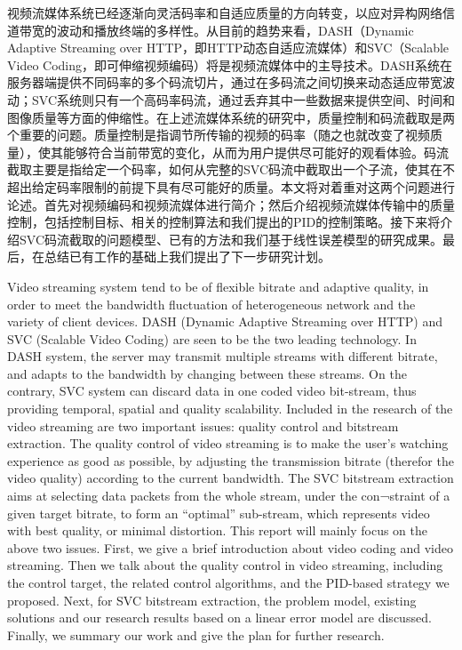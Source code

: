 \begin{cabstract}
视频流媒体系统已经逐渐向灵活码率和自适应质量的方向转变，以应对异构网络信道带宽的波动和播放终端的多样性。从目前的趋势来看，DASH（Dynamic Adaptive Streaming over HTTP，即HTTP动态自适应流媒体）和SVC（Scalable Video Coding，即可伸缩视频编码）将是视频流媒体中的主导技术。DASH系统在服务器端提供不同码率的多个码流切片，通过在多码流之间切换来动态适应带宽波动；SVC系统则只有一个高码率码流，通过丢弃其中一些数据来提供空间、时间和图像质量等方面的伸缩性。在上述流媒体系统的研究中，质量控制和码流截取是两个重要的问题。质量控制是指调节所传输的视频的码率（随之也就改变了视频质量），使其能够符合当前带宽的变化，从而为用户提供尽可能好的观看体验。码流截取主要是指给定一个码率，如何从完整的SVC码流中截取出一个子流，使其在不超出给定码率限制的前提下具有尽可能好的质量。本文将对着重对这两个问题进行论述。首先对视频编码和视频流媒体进行简介；然后介绍视频流媒体传输中的质量控制，包括控制目标、相关的控制算法和我们提出的PID的控制策略。接下来将介绍SVC码流截取的问题模型、已有的方法和我们基于线性误差模型的研究成果。最后，在总结已有工作的基础上我们提出了下一步研究计划。
\end{cabstract}

\begin{eabstract}
Video streaming system tend to be of flexible bitrate and adaptive quality, in order to meet the bandwidth fluctuation of heterogeneous network and the variety of client devices. DASH (Dynamic Adaptive Streaming over HTTP) and SVC (Scalable Video Coding) are seen to be the two leading technology. In DASH system, the server may transmit multiple streams with different bitrate, and adapts to the bandwidth by changing between these streams. On the contrary, SVC system can discard data in one coded video bit-stream, thus providing temporal, spatial and quality scalability. Included in the research of the video streaming are two important issues: quality control and bitstream extraction. The quality control of video streaming is to make the user’s watching experience as good as possible, by adjusting the transmission bitrate (therefor the video quality) according to the current bandwidth. The SVC bitstream extraction aims at selecting data packets from the whole stream, under the con¬straint of a given target bitrate, to form an “optimal” sub-stream, which represents video with best quality, or minimal distortion. This report will mainly focus on the above two issues. First, we give a brief introduction about video coding and video streaming. Then we talk about the quality control in video streaming, including the control target, the related control algorithms, and the PID-based strategy we proposed. Next, for SVC bitstream extraction, the problem model, existing solutions and our research results based on a linear error model are discussed. Finally, we summary our work and give the plan for further research.
\end{eabstract}